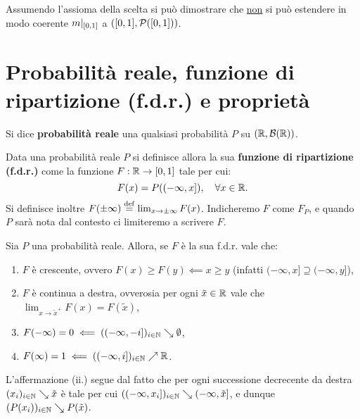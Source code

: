 \begin{multicols*}{2}
\begin{remark}
    Assumendo l'assioma della scelta si può dimostrare che \underline{non} si può estendere in modo coerente
    $m\arrowvert_{[0,1]}$ a $([0, 1], \mathcal{P}([0, 1]))$.
\end{remark}

\section{Probabilità reale, funzione di ripartizione (f.d.r.) e proprietà}

\begin{definition}
    Si dice \textbf{probabilità reale} una qualsiasi
    probabilità $P$ su $(\mathbb{R}, \mathcal{B}(\mathbb{R}))$.
\end{definition}

\begin{definition}
    Data una probabilità reale $P$ si definisce
    allora la sua \textbf{funzione di ripartizione (f.d.r.)}
    come la funzione $F : \mathbb{R} \to [0, 1]$ tale per cui:
    \[
        F(x) = P((-\infty, x]), \quad \forall x \in \mathbb{R}.
    \]
    Si definisce inoltre $F(\pm\infty) \overset{\mathrm{def}}{=} \lim_{x \to \pm\infty} F(x)$.
    Indicheremo $F$ come $F_P$, e quando $P$ sarà nota dal contesto
    ci limiteremo a scrivere $F$.
\end{definition}

\begin{proposition}
    Sia $P$ una probabilità reale. Allora, se $F$ è la
    sua f.d.r. vale che:
    \begin{enumerate}[(i.)]
        \item $F$ è crescente, ovvero $F(x) \geq F(y) \impliedby x \geq y$ (infatti $(-\infty, x] \supseteq (-\infty, y]$),
        \item $F$ è continua a destra, ovverosia per ogni $\tilde{x} \in \mathbb{R}$ vale che $\lim_{x \to \tilde{x}^+} F(x) = F(\tilde{x})$,
        \item $F(-\infty) = 0 \impliedby ((-\infty, -i])_{i \in \mathbb{N}} \searrow \emptyset$,
        \item $F(\infty) = 1 \impliedby ((-\infty, i])_{i \in \mathbb{N}} \nearrow \mathbb{R}$.
    \end{enumerate}


    L'affermazione (ii.) segue dal fatto che per ogni successione decrecente da destra $(x_i)_{i \in \mathbb{N}} \searrow \tilde{x}$ è
    tale per cui $((-\infty, x_i])_{i \in \mathbb{N}} \searrow (-\infty, \tilde{x}]$, e dunque
    $(P(x_i))_{i \in \mathbb{N}} \searrow P(\tilde{x})$.
\end{proposition}


\end{multicols*}
